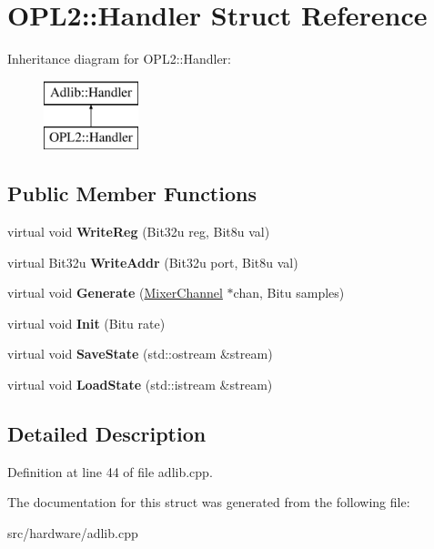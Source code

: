 \hypertarget{structOPL2_1_1Handler}{\section{O\-P\-L2\-:\-:Handler Struct Reference}
\label{structOPL2_1_1Handler}
}
Inheritance diagram for O\-P\-L2\-:\-:Handler\-:\begin{figure}[H]
\begin{center}
\leavevmode
\includegraphics[height=2.000000cm]{structOPL2_1_1Handler}
\end{center}
\end{figure}
\subsection*{Public Member Functions}
\begin{DoxyCompactItemize}
\item 
\hypertarget{structOPL2_1_1Handler_abb646d55a924a8f63f8886aa2424011c}{virtual void {\bfseries Write\-Reg} (Bit32u reg, Bit8u val)}\label{structOPL2_1_1Handler_abb646d55a924a8f63f8886aa2424011c}

\item 
\hypertarget{structOPL2_1_1Handler_a4ce8eb3de6766097896a65d6a0add8eb}{virtual Bit32u {\bfseries Write\-Addr} (Bit32u port, Bit8u val)}\label{structOPL2_1_1Handler_a4ce8eb3de6766097896a65d6a0add8eb}

\item 
\hypertarget{structOPL2_1_1Handler_a6e5217a83415a24708e245e86c27180d}{virtual void {\bfseries Generate} (\hyperlink{classMixerChannel}{Mixer\-Channel} $\ast$chan, Bitu samples)}\label{structOPL2_1_1Handler_a6e5217a83415a24708e245e86c27180d}

\item 
\hypertarget{structOPL2_1_1Handler_aaaf822d10e0b19c29aa6a2bc5ad2a9df}{virtual void {\bfseries Init} (Bitu rate)}\label{structOPL2_1_1Handler_aaaf822d10e0b19c29aa6a2bc5ad2a9df}

\item 
\hypertarget{structOPL2_1_1Handler_a153729bb4839aa38573b3d6d67548fcf}{virtual void {\bfseries Save\-State} (std\-::ostream \&stream)}\label{structOPL2_1_1Handler_a153729bb4839aa38573b3d6d67548fcf}

\item 
\hypertarget{structOPL2_1_1Handler_a3cdd8c246a52a6a93826ce106c023c21}{virtual void {\bfseries Load\-State} (std\-::istream \&stream)}\label{structOPL2_1_1Handler_a3cdd8c246a52a6a93826ce106c023c21}

\end{DoxyCompactItemize}


\subsection{Detailed Description}


Definition at line 44 of file adlib.\-cpp.



The documentation for this struct was generated from the following file\-:\begin{DoxyCompactItemize}
\item 
src/hardware/adlib.\-cpp\end{DoxyCompactItemize}

